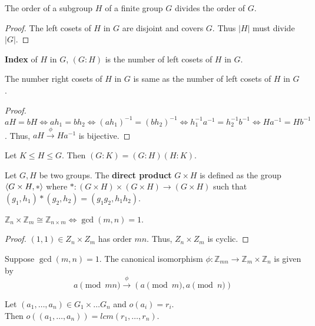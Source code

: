 \begin{theorem}[Lagrange]
	The order of a subgroup $H$ of a finite group $G$  divides the order of $G$.
\end{theorem}
\begin{proof}
	The left cosets of $H$ in $G$ are disjoint and covers $G$. Thus $|H|$ must divide $|G|$.
\end{proof}

\begin{definition}
	\textbf{Index} of $H$ in $G$, $(G:H)$ is the number of left cosets of $H$ in $G$.
\end{definition}
\begin{theorem}
	The number right cosets of $H$ in $G$ is same as the number of left cosets of $H$ in $G$.
\end{theorem}
\begin{proof}
	$aH = bH \iff ah_1 = bh_2 \iff (ah_1)^{-1} = (bh_2)^{-1} \iff h_1^{-1}a^{-1} = h_2^{-1}b^{-1} \iff Ha^{-1} = Hb^{-1}$.
	Thus, $aH \overset{\phi}{\to} Ha^{-1}$ is bijective.
\end{proof}

\begin{theorem}
	Let $K \le H \le G$.
	Then $(G:K) = (G:H)(H:K)$.
\end{theorem}

\begin{definition}
	Let $G,H$ be two groups.
	The \textbf{direct product} $G \times H$ is defined as the group $\left\langle G \times H,\ast \right\rangle$ where $\ast : (G \times H) \times (G \times H) \to (G \times H)$ such that $(g_1,h_1) \ast (g_2,h_2) = (g_1g_2,h_1h_2)$.
\end{definition}

\begin{theorem}
	$\mathbb{Z}_n \times \mathbb{Z}_m \cong \mathbb{Z}_{n \times m} \iff \gcd(m,n)=1$.
\end{theorem}
\begin{proof}
	$(1,1) \in Z_n \times Z_m$ has order $mn$.
	Thus, $Z_n \times Z_m$ is cyclic.
\end{proof}
	Suppose $\gcd(m,n) = 1$.
	The canonical isomorphism $\phi : \mathbb{Z}_{mn} \to \mathbb{Z}_m \times \mathbb{Z}_n$ is given by
	$$ a\!\!\!\!\! \pmod{mn} \overset{\phi}{\to} \left(a\!\!\!\!\! \pmod{m}, a\!\!\!\!\! \pmod{n}\right) $$

\begin{theorem}
	Let $(a_1,\dots,a_n) \in G_1 \times \dots G_n$ and $o(a_i) = r_i$.\\
	Then $o((a_1,\dots,a_n)) = lcm(r_1,\dots,r_n)$.
\end{theorem}

